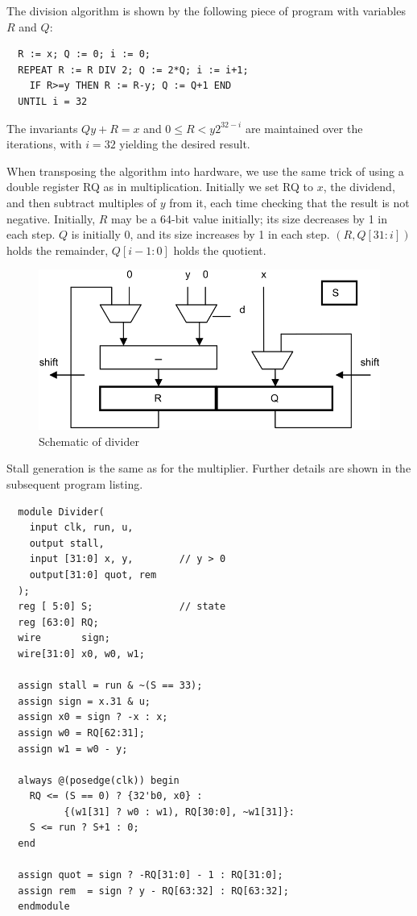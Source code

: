 The division algorithm is shown by the following piece of program with variables $R$ and $Q$:
\begin{verbatim}
  R := x; Q := 0; i := 0;
  REPEAT R := R DIV 2; Q := 2*Q; i := i+1;
    IF R>=y THEN R := R-y; Q := Q+1 END
  UNTIL i = 32
\end{verbatim}

The invariants $Qy + R = x$ and $0 \le R < y2^{32-i}$ are maintained over the iterations, with
$i = 32$ yielding the desired result.

When transposing the algorithm into hardware, we use the same trick of using a double register
RQ as in multiplication. Initially we set RQ to $x$, the dividend, and then subtract multiples of $y$ from
it, each time checking that the result is not negative. Initially, $R$ may be a 64-bit value
initially; its size decreases by 1 in each step. $Q$ is initially 0, and its size increases by 1 in
each step. $(R, Q[31:i])$ holds the remainder, $Q[i-1:0]$ holds the quotient.
\begin{figure}[h!]
  \centering
  \includegraphics[width=.9\textwidth]{i/b.png}
  \caption{Schematic of divider}
  \label{fig:divider}
\end{figure}

Stall generation is the same as for the multiplier. Further details are shown in the subsequent
program listing.
\begin{verbatim}
  module Divider(
    input clk, run, u,
    output stall,
    input [31:0] x, y,        // y > 0
    output[31:0] quot, rem
  );
  reg [ 5:0] S;               // state
  reg [63:0] RQ;
  wire       sign;
  wire[31:0] x0, w0, w1;
 
  assign stall = run & ~(S == 33);
  assign sign = x.31 & u;
  assign x0 = sign ? -x : x;
  assign w0 = RQ[62:31];
  assign w1 = w0 - y;
 
  always @(posedge(clk)) begin
    RQ <= (S == 0) ? {32'b0, x0} :
          {(w1[31] ? w0 : w1), RQ[30:0], ~w1[31]}:
    S <= run ? S+1 : 0;
  end
 
  assign quot = sign ? -RQ[31:0] - 1 : RQ[31:0];
  assign rem  = sign ? y - RQ[63:32] : RQ[63:32];
  endmodule
\end{verbatim}

